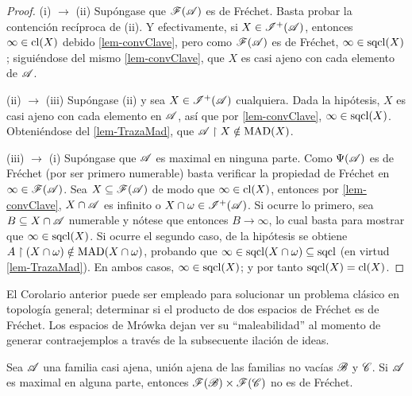  \begin{proof}
  (i) $\to$ (ii) Supóngase que $\mathscr{F}(\mathscr{A})$ es de Fréchet. Basta probar la contención recíproca de (ii). Y efectivamente, si $X \in \mathscr{I}^+(\mathscr{A})$, entonces $\infty \in \operatorname{cl}(X)$ debido \ref{lem-convClave}, pero como $\mathscr{F}(\mathscr{A})$ es de Fréchet, $\infty \in \operatorname{sqcl}(X)$; siguiéndose del mismo \autoref{lem-convClave}, que $X$ es casi ajeno con cada elemento de $\mathscr{A}$.

  (ii) $\to$ (iii) Supóngase (ii) y sea $X \in \mathscr{I}^+(\mathscr{A})$ cualquiera. Dada la hipótesis, $X$ es casi ajeno con cada elemento en $\mathscr{A}$, así que por \ref{lem-convClave}, $\infty \in \operatorname{sqcl}(X)$. Obteniéndose del \autoref{lem-TrazaMad}, que $\mathscr{A} \upharpoonright X \notin \operatorname{MAD}(X)$.

  (iii) $\to$ (i) Supóngase que $\mathscr{A}$ es maximal en ninguna parte. Como $\Psi(\mathscr{A})$ es de Fréchet (por ser primero numerable) basta verificar la propiedad de Fréchet en $\infty \in \mathscr{F}(\mathscr{A})$. Sea $X \subseteq \mathscr{F}(\mathscr{A})$ de modo que $\infty \in \operatorname{cl}(X)$, entonces por \ref{lem-convClave}, $X \cap \mathscr{A}$ es infinito o $X \cap \omega \in \mathscr{I}^+(\mathscr{A})$. Si ocurre lo primero, sea $B \subseteq X \cap \mathscr{A}$ numerable y nótese que entonces $B \to \infty$, lo cual basta para mostrar que $\infty \in \operatorname{sqcl}(X)$. Si ocurre el segundo caso, de la hipótesis se obtiene $A \upharpoonright (X \cap \omega) \notin \operatorname{MAD}(X \cap \omega)$, probando que $\infty \in \operatorname{sqcl}(X \cap \omega) \subseteq \operatorname{sqcl}$ (en virtud \ref{lem-TrazaMad}). En ambos casos, $\infty \in \operatorname{sqcl}(X)$; y por tanto $\operatorname{sqcl}(X)=\operatorname{cl}(X)$.
 \end{proof}

 El Corolario anterior puede ser empleado para solucionar un problema clásico en topología general; determinar si el producto de dos espacios de Fréchet es de Fréchet. Los espacios de Mrówka dejan ver su ``maleabilidad'' al momento de generar contraejemplos a través de la subsecuente ilación de ideas.

 \begin{proposicion}
  Sea $\mathscr{A}$ una familia casi ajena, unión ajena de las familias no vacías $\mathscr{B}$ y $\mathscr{C}$. Si $\mathscr{A}$ es maximal en alguna parte, entonces $\mathscr{F}(\mathscr{B}) \times \mathscr{F}(\mathscr{C})$ no es de Fréchet.
 \end{proposicion}

